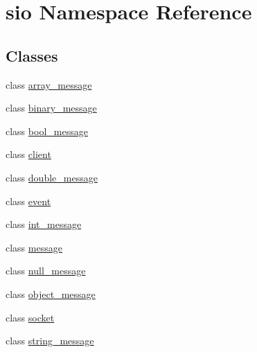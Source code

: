 \hypertarget{namespacesio}{}\section{sio Namespace Reference}
\label{namespacesio}
\subsection*{Classes}
\begin{DoxyCompactItemize}
\item 
class \hyperlink{classsio_1_1array__message}{array\+\_\+message}
\item 
class \hyperlink{classsio_1_1binary__message}{binary\+\_\+message}
\item 
class \hyperlink{classsio_1_1bool__message}{bool\+\_\+message}
\item 
class \hyperlink{classsio_1_1client}{client}
\item 
class \hyperlink{classsio_1_1double__message}{double\+\_\+message}
\item 
class \hyperlink{classsio_1_1event}{event}
\item 
class \hyperlink{classsio_1_1int__message}{int\+\_\+message}
\item 
class \hyperlink{classsio_1_1message}{message}
\item 
class \hyperlink{classsio_1_1null__message}{null\+\_\+message}
\item 
class \hyperlink{classsio_1_1object__message}{object\+\_\+message}
\item 
class \hyperlink{classsio_1_1socket}{socket}
\item 
class \hyperlink{classsio_1_1string__message}{string\+\_\+message}
\end{DoxyCompactItemize}
